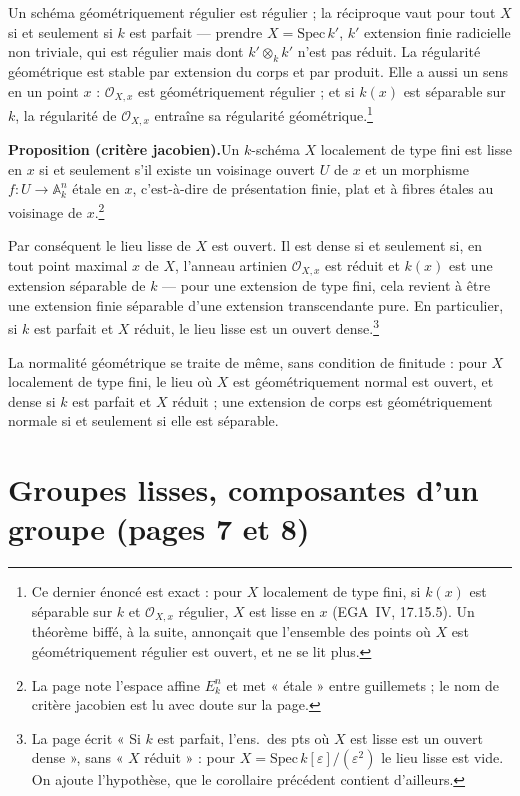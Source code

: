 \documentclass[11pt,a4paper]{article}
\begin{document}
Un schéma géométriquement régulier est régulier ; la réciproque vaut pour
tout $X$ si et seulement si $k$ est parfait --- prendre
$X = \mathrm{Spec}\, k'$, $k'$ extension finie radicielle non triviale, qui
est régulier mais dont $k' \otimes_{k} k'$ n'est pas réduit. La régularité
géométrique est stable par extension du corps et par produit. Elle a aussi
un sens en un point $x$ : $\mathcal{O}_{X,x}$ est géométriquement régulier ;
et si $k(x)$ est séparable sur $k$, la régularité de $\mathcal{O}_{X,x}$
entraîne sa régularité géométrique.\footnote{Ce dernier énoncé est exact :
pour $X$ localement de type fini, si $k(x)$ est séparable sur $k$ et
$\mathcal{O}_{X,x}$ régulier, $X$ est lisse en $x$ (EGA~IV, 17.15.5). Un
théorème biffé, à la suite, annonçait que l'ensemble des points où $X$ est
géométriquement régulier est ouvert, et ne se lit plus.}

\textbf{Proposition (critère jacobien).}\quad Un $k$-schéma $X$ localement de type fini est lisse en $x$ si et seulement
s'il existe un voisinage ouvert $U$ de $x$ et un morphisme
$f \colon U \to \mathbb{A}^{n}_{k}$ étale en $x$, c'est-à-dire de
présentation finie, plat et à fibres étales au voisinage de
$x$.\footnote{La page note l'espace affine $E^{n}_{k}$ et met « étale » entre
guillemets ; le nom de critère jacobien est lu avec doute sur la page.}

Par conséquent le lieu lisse de $X$ est ouvert. Il est dense si et seulement
si, en tout point maximal $x$ de $X$, l'anneau artinien $\mathcal{O}_{X,x}$
est réduit et $k(x)$ est une extension séparable de $k$ --- pour une
extension de type fini, cela revient à être une extension finie séparable
d'une extension transcendante pure. En particulier, si $k$ est parfait et
$X$ réduit, le lieu lisse est un ouvert dense.\footnote{La page écrit « Si
$k$ est parfait, l'ens.\ des pts où $X$ est lisse est un ouvert dense », sans
« $X$ réduit » : pour $X = \mathrm{Spec}\, k[\varepsilon]/(\varepsilon^{2})$
le lieu lisse est vide. On ajoute l'hypothèse, que le corollaire précédent
contient d'ailleurs.}

La normalité géométrique se traite de même, sans condition de finitude : pour
$X$ localement de type fini, le lieu où $X$ est géométriquement normal est
ouvert, et dense si $k$ est parfait et $X$ réduit ; une extension de corps
est géométriquement normale si et seulement si elle est séparable.

\section*{Groupes lisses, composantes d'un groupe (pages 7 et 8)}
\end{document}

